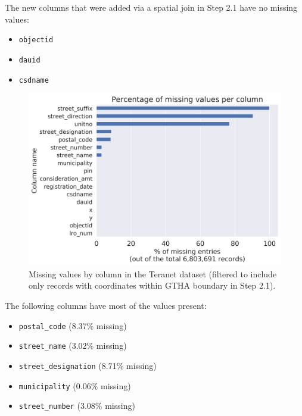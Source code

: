 \documentclass[11pt]{article}
\begin{document}
    \vspace{5mm}

    The new columns that were added via a spatial join in Step 2.1 have no missing values:

    \begin{itemize}
        \item \texttt{objectid}
        \item \texttt{dauid}
        \item \texttt{csdname}
    \end{itemize}
    \begin{figure}[hbt!]
        \centering
        \includegraphics[width=1\linewidth,trim=1 1 1 1,clip]{img/teranet_na_perc.png}
        \caption{Missing values by column in the Teranet dataset (filtered to include only records with coordinates within GTHA boundary in Step 2.1).}
        \label{fig:teranet_na_counts}
    \end{figure}

    \newpage

    The following columns have most of the values present:

    \begin{itemize}
        \item \texttt{postal\_code} (8.37\% missing)
        \item \texttt{street\_name} (3.02\% missing)
        \item \texttt{street\_designation} (8.71\% missing)
        \item \texttt{municipality} (0.06\% missing)
        \item \texttt{street\_number} (3.08\% missing)
    \end{itemize}
\end{document}
